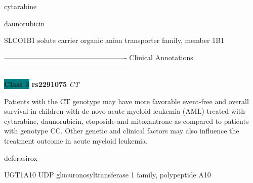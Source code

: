 \documentclass{resume} %
\begin{document}
\begin{rSection}{ cytarabine }
\end{rSection}\begin{rSection}{ daunorubicin }
\item[]

\begin{rSubsection}{ SLCO1B1 }{ solute carrier organic anion transporter family, member 1B1 }{}{}
\item[]

\item[] ---------------------------------------------------- Clinical Annotations -----------------------------------------------------\newline
\item \textbf{\colorbox{teal} {Class 3}} \textbf{ rs2291075 } \textit{ CT }
\item[] Patients with the CT genotype may have more favorable event-free and overall survival in children with de novo acute myeloid leukemia (AML) treated with cytarabine, daunorubicin, etoposide and mitoxantrone as compared to patients with genotype CC. Other genetic and clinical factors may also influence the treatment outcome in acute myeloid leukemia.
\end{rSubsection}

\end{rSection}\begin{rSection}{ deferasirox }
\item[]

\begin{rSubsection}{ UGT1A10 }{ UDP glucuronosyltransferase 1 family, polypeptide A10 }{}{}
\item[]


\end{rSubsection}
\end{rSection}
\end{document}
